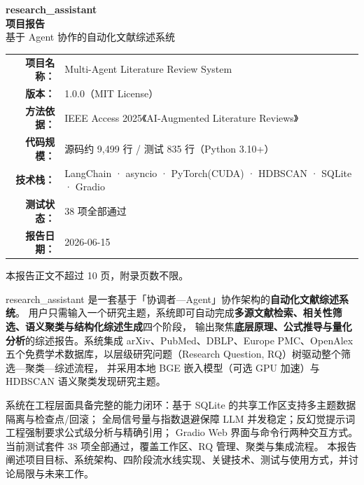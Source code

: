 \documentclass[10pt,a4paper]{article}
\begin{document}
\begin{titlepage}
\centering
\vspace*{2.2cm}
{\Huge\bfseries research\_assistant\\[0.3em] 项目报告}\\[0.4em]
{\large\color{gray} 基于 Agent 协作的自动化文献综述系统}\\[2.4cm]
\begin{tabular}{rl}
\textbf{项目名称：} & Multi-Agent Literature Review System \\
\textbf{版本：} & 1.0.0（MIT License）\\
\textbf{方法依据：} & IEEE Access 2025《AI-Augmented Literature Reviews》 \\
\textbf{代码规模：} & 源码约 9{,}499 行 / 测试 835 行（Python 3.10+） \\
\textbf{技术栈：} & LangChain · asyncio · PyTorch(CUDA) · HDBSCAN · SQLite · Gradio \\
\textbf{测试状态：} & 38 项全部通过 \\
\textbf{报告日期：} & 2026-06-15 \\
\end{tabular}
\vfill
{\small\color{gray} 本报告正文不超过 10 页，附录页数不限。}
\end{titlepage}

\noindent\begin{tcolorbox}[colback=blue!4,colframe=blue!40!black,boxrule=0.4pt,arc=2pt,title=\textbf{摘要}]
\setlength{\parindent}{2em}
research\_assistant 是一套基于「协调者—Agent」协作架构的\textbf{自动化文献综述系统}。
用户只需输入一个研究主题，系统即可自动完成\textbf{多源文献检索、相关性筛选、语义聚类与结构化综述生成}四个阶段，
输出聚焦\textbf{底层原理、公式推导与量化分析}的综述报告。系统集成 arXiv、PubMed、DBLP、Europe PMC、OpenAlex
五个免费学术数据库，以层级研究问题（Research Question, RQ）树驱动整个筛选—聚类—综述流程，
并采用本地 BGE 嵌入模型（可选 GPU 加速）与 HDBSCAN 语义聚类发现研究主题。

系统在工程层面具备完整的能力闭环：基于 SQLite 的共享工作区支持多主题数据隔离与检查点/回滚；
全局信号量与指数退避保障 LLM 并发稳定；反幻觉提示词工程强制要求公式级分析与精确引用；
Gradio Web 界面与命令行两种交互方式。当前测试套件 38 项全部通过，覆盖工作区、RQ 管理、聚类与集成流程。
本报告阐述项目目标、系统架构、四阶段流水线实现、关键技术、测试与使用方式，并讨论局限与未来工作。
\end{tcolorbox}
\end{document}
